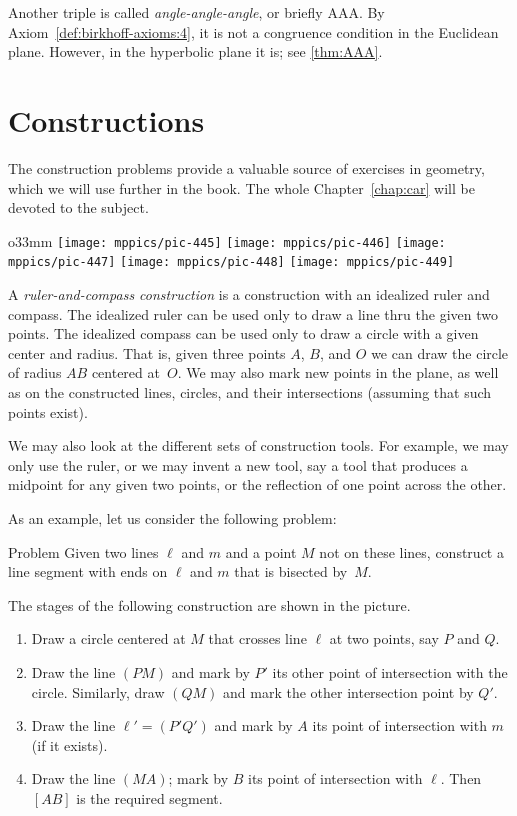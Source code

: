 Another triple is called {}\emph{angle-angle-angle}, or briefly AAA.
By Axiom~\ref{def:birkhoff-axioms:4}, it is not a congruence condition in the Euclidean plane.
However, in the hyperbolic plane it is; see \ref{thm:AAA}.

\section{Constructions}

The construction problems provide a valuable source of exercises in geometry,
which we will use further in the book.
The whole Chapter~\ref{chap:car} will be devoted to the subject.

{

\begin{wrapfigure}{o}{33mm}
\vskip-4mm
\centering
\texttt{[image: mppics/pic-445]}
\bigskip
\texttt{[image: mppics/pic-446]}
\bigskip
\texttt{[image: mppics/pic-447]}
\bigskip
\texttt{[image: mppics/pic-448]}
\bigskip
\texttt{[image: mppics/pic-449]}
\end{wrapfigure}

A \emph{ruler-and-compass construction} is a construction with an idealized ruler and compass.
The idealized ruler can be used only to draw a line thru the given two points.
The idealized compass can be used only to draw a circle with a given center and radius.
That is, given three points $A$, $B$, and $O$
we can draw the circle of radius $AB$ centered at~$O$.
We may also mark new points in the plane,
as well as on the constructed lines, circles,
and their intersections (assuming that such points exist).

We may also look at the different sets of construction tools.
For example,
we may only use the ruler,
or we may invent a new tool,
say a tool that produces a midpoint for any given two points,
or the reflection of one point across the other.

As an example, let us consider the following problem:

\begin{thm}{Problem}
Given two lines $\ell$ and $m$ and a point $M$ not on these lines,
construct a line segment with ends on $\ell$ and $m$ that is bisected by~$M$.
\end{thm}

The stages of the following construction are shown in the picture.

\begin{enumerate}[1.]
\item Draw a circle centered at $M$ that crosses line $\ell$ at two points, say $P$ and $Q$.
\item Draw the line $(PM)$ and mark by $P'$ its other point of intersection with the circle.
Similarly, draw $(QM)$ and mark the other intersection point by $Q'$.
\item Draw the line $\ell'=(P'Q')$ and mark by $A$ its point of intersection with $m$ (if it exists).
\item Draw the line $(MA)$;
mark by $B$ its point of intersection with $\ell$.
Then $[AB]$ is the required segment.
\end{enumerate}

}

